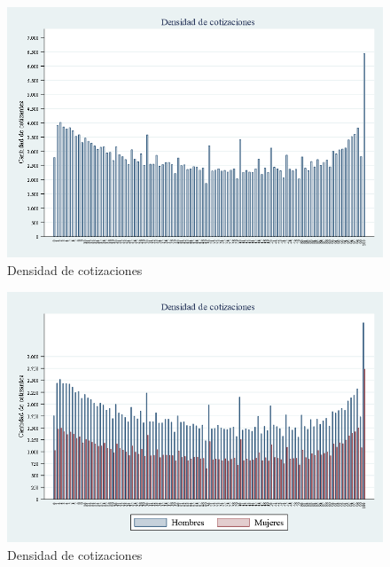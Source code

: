 \begin{figure}[H]
\begin{center}
                    \caption{Densidad de cotizaciones}
                    \vspace{0.5cm}
                    \includegraphics[scale=0.35]{dencot.png}
\end{center}
\end{figure}

\begin{figure}[H]
\begin{center}
                    \caption{Densidad de cotizaciones}
                    \vspace{0.5cm}
                    \includegraphics[scale=0.35]{dencot_by_sex}
\end{center}
\end{figure}
